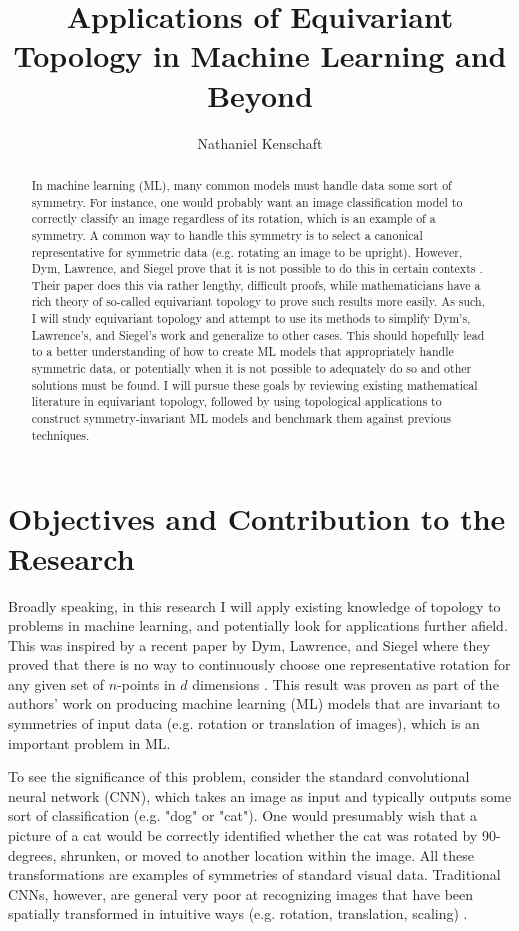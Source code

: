 \documentclass[12pt]{article}
\title{Applications of Equivariant Topology in Machine Learning and Beyond}
\author{Nathaniel Kenschaft}
\date{}
\begin{document}
\maketitle

\begin{abstract}
    In machine learning (ML), many common models must handle data some sort of symmetry.
    For instance, one would probably want an image classification model to correctly classify an image regardless of its rotation, which is an example of a symmetry.
    A common way to handle this symmetry is to select a canonical representative for symmetric data (e.g. rotating an image to be upright).
    However, Dym, Lawrence, and Siegel prove that it is not possible to do this in certain contexts \cite{dym2024equivariant}.
    Their paper does this via rather lengthy, difficult proofs, while mathematicians have a rich theory of so-called equivariant topology to prove such results more easily.
    As such, I will study equivariant topology and attempt to use its methods to simplify Dym's, Lawrence's, and Siegel's work and generalize to other cases.
    This should hopefully lead to a better understanding of how to create ML models that appropriately handle symmetric data, or potentially when it is not possible to adequately do so and other solutions must be found.
    I will pursue these goals by reviewing existing mathematical literature in equivariant topology, followed by using topological applications to construct symmetry-invariant ML models and benchmark them against previous techniques.


\end{abstract}

\section{Objectives and Contribution to the Research}
Broadly speaking, in this research I will apply existing knowledge of topology to problems in machine learning, and potentially look for applications further afield.
This was inspired by a recent paper by Dym, Lawrence, and Siegel where they proved that there is no way to continuously choose one representative rotation for any given set of $n$-points in $d$ dimensions \cite{dym2024equivariant}.
This result was proven as part of the authors' work on producing machine learning (ML) models that are invariant to symmetries of input data (e.g. rotation or translation of images), which is an important problem in ML.

To see the significance of this problem, consider the standard convolutional neural network (CNN), which takes an image as input and typically outputs some sort of classification (e.g. "dog" or "cat").
One would presumably wish that a picture of a cat would be correctly identified whether the cat was rotated by 90-degrees, shrunken, or moved to another location within the image.
All these transformations are examples of symmetries of standard visual data.
Traditional CNNs, however, are general very poor at recognizing images that have been spatially transformed in intuitive ways (e.g. rotation, translation, scaling) \cite{shen2019cnninvariance}.
\end{document}
